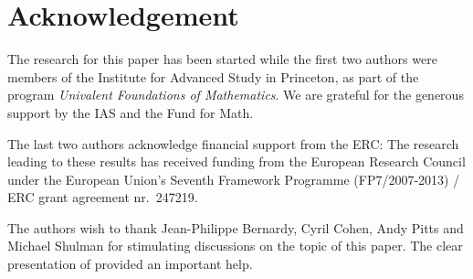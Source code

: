 \documentclass[10pt,a4paper]{article}
\begin{document}
\section*{Acknowledgement}
The research for this paper has been started while the first two
authors were members of the Institute for Advanced Study in Princeton,
as part of the program \emph{Univalent Foundations of Mathematics}.
We are grateful for the generous support by the IAS and the Fund for Math.

The last two authors acknowledge financial support from the ERC:  The research leading
to these results has received funding from the European Research Council under
the European Union's Seventh Framework Programme (FP7/2007-2013) / ERC
grant agreement nr.\ 247219.

 The authors wish to thank Jean-Philippe Bernardy, Cyril Cohen, Andy Pitts and Michael Shulman
for stimulating discussions on the topic of this paper. The clear presentation of \cite{Williamson}
provided an important help.
\end{document}
